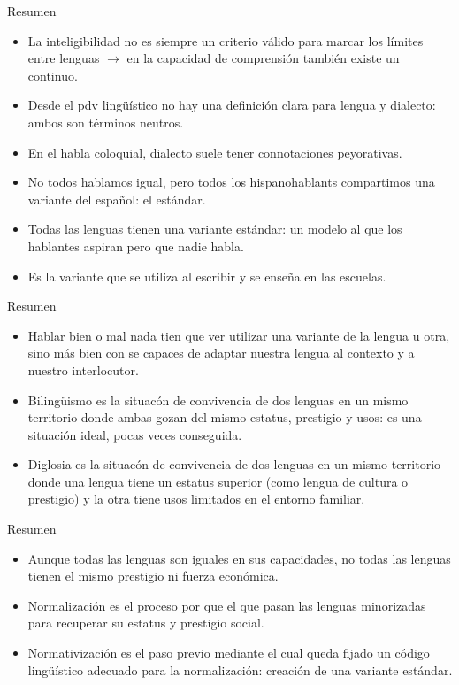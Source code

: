 \documentclass[handout]{beamer}
\begin{document}
\begin{frame}{Resumen}
\begin{itemize}
	\item La inteligibilidad no es siempre un criterio válido para marcar los límites entre lenguas $\rightarrow$ en la capacidad de comprensión también existe un continuo.
	\item Desde el pdv lingüístico no hay una definición clara para lengua y dialecto: ambos son términos neutros.
	\item En el habla coloquial, dialecto suele tener connotaciones peyorativas.
	\item No todos hablamos igual, pero todos los hispanohablants compartimos una variante del español: el estándar.
	\item Todas las lenguas tienen una variante estándar: un modelo al que los hablantes aspiran pero que nadie habla.
	\item Es la variante que se utiliza al escribir y se enseña en las escuelas.
\end{itemize}
\end{frame}

\begin{frame}{Resumen}
\begin{itemize}
	\item Hablar bien o mal nada tien que ver utilizar una variante de la lengua u otra, sino más bien con se capaces de adaptar nuestra lengua al contexto y a nuestro interlocutor.
	\item Bilingüismo es la situacón de convivencia de dos lenguas en un mismo territorio donde ambas gozan del mismo estatus, prestigio y usos: es una situación ideal, pocas veces conseguida.
	\item Diglosia es la situacón de convivencia de dos lenguas en un mismo territorio donde una lengua tiene un estatus superior (como lengua de cultura o prestigio) y la otra tiene usos limitados en el entorno familiar.
\end{itemize}
\end{frame}

\begin{frame}{Resumen}
\begin{itemize}
	\item Aunque todas las lenguas son iguales en sus capacidades, no todas las lenguas tienen el mismo prestigio ni fuerza económica.
	\item Normalización es el proceso por que el que pasan las lenguas minorizadas para recuperar su estatus y prestigio social.
	\item Normativización es el paso previo mediante el cual queda fijado un código lingüístico adecuado para la normalización: creación de una variante estándar.
\end{itemize}
\end{frame}
\end{document}
